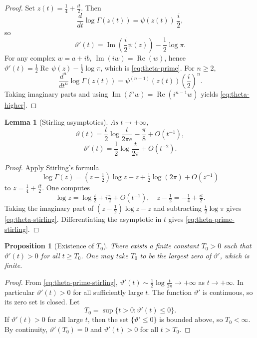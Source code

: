 \documentclass[11pt]{article}
\numberwithin{equation}{section}
\theoremstyle{plain}
\newtheorem{lemma}[theorem]{Lemma}
\newtheorem{proposition}[theorem]{Proposition}
\theoremstyle{definition}
\DeclareMathOperator{\Ree}{Re}
\DeclareMathOperator{\Imm}{Im}
\begin{document}
\begin{proof}
Set \(z(t)=\frac14+\frac{it}{2}\). Then
\[
\frac{d}{dt}\log\Gamma(z(t))=\psi(z(t))\,\frac{i}{2},
\]
so
\[
\vartheta'(t)=\Imm\!\left(\frac{i}{2}\psi(z)\right)-\frac12\log\pi.
\]
For any complex \(w=a+ib\), \(\Imm(iw)=\Ree(w)\), hence
\(\vartheta'(t)=\frac12\Ree\,\psi(z)-\frac12\log\pi\),
which is \eqref{eq:theta-prime}. For \(n\ge2\),
\[
\frac{d^n}{dt^n}\log\Gamma(z(t))
=\psi^{(n-1)}(z(t))\left(\frac{i}{2}\right)^n.
\]
Taking imaginary parts and using \(\Imm(i^n w)=\Ree(i^{n-1}w)\) yields
\eqref{eq:theta-higher}.
\end{proof}

\begin{lemma}[Stirling asymptotics]
\label{lem:stirling}
As \(t\to+\infty\),
\begin{equation}
\vartheta(t)
=
\frac{t}{2}\log\frac{t}{2\pi e}
-\frac{\pi}{8}
+O(t^{-1}),
\label{eq:theta-stirling}
\end{equation}
\begin{equation}
\vartheta'(t)
=
\frac12\log\frac{t}{2\pi}
+O(t^{-2}).
\label{eq:theta-prime-stirling}
\end{equation}
\end{lemma}

\begin{proof}
Apply Stirling's formula
\[
\log\Gamma(z)=\left(z-\tfrac12\right)\log z-z+\tfrac12\log(2\pi)+O(z^{-1})
\]
to \(z=\frac14+\frac{it}{2}\). One computes
\[
\log z=\log\tfrac{t}{2}+i\tfrac{\pi}{2}+O(t^{-1}),
\quad
z-\tfrac12=-\tfrac14+\tfrac{it}{2}.
\]
Taking the imaginary part of \((z-\tfrac12)\log z-z\) and subtracting
\(\frac{t}{2}\log\pi\) gives \eqref{eq:theta-stirling}. Differentiating the asymptotic
in \(t\) gives \eqref{eq:theta-prime-stirling}.
\end{proof}

\begin{proposition}[Existence of \(T_0\)]
\label{prop:T0}
There exists a finite constant \(T_0>0\) such that \(\vartheta'(t)>0\) for all
\(t\ge T_0\). One may take \(T_0\) to be the largest zero of \(\vartheta'\), which
is finite.
\end{proposition}

\begin{proof}
From \eqref{eq:theta-prime-stirling}, \(\vartheta'(t)\sim\frac12\log\frac{t}{2\pi}\to+\infty\)
as \(t\to+\infty\). In particular \(\vartheta'(t)>0\) for all sufficiently large \(t\).
The function \(\vartheta'\) is continuous, so its zero set is closed. Let
\[
T_0=\sup\{t>0:\vartheta'(t)\le0\}.
\]
If \(\vartheta'(t)>0\) for all large \(t\), then the set \(\{\vartheta'\le0\}\) is
bounded above, so \(T_0<\infty\). By continuity, \(\vartheta'(T_0)=0\) and
\(\vartheta'(t)>0\) for all \(t>T_0\).
\end{proof}
\end{document}
